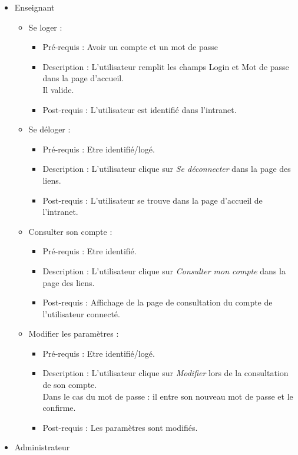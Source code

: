 	\begin{itemize}
	\item Enseignant
		\begin{itemize}
		\item Se loger :
			\begin{itemize}
			\item Pr{\'e}-requis : Avoir un compte et un mot de passe
			\item Description : L'utilisateur remplit les
			champs Login et Mot de passe dans la page d'accueil.\\
			Il valide.
			\item Post-requis : L'utilisateur est identifi{\'e} dans l'intranet.
			\end{itemize}
		\item Se d{\'e}loger :
			\begin{itemize}
			\item Pr{\'e}-requis : Etre identifi{\'e}/log{\'e}. 
			\item Description : L'utilisateur clique sur
			{\it Se d{\'e}connecter} dans la page des liens.
			\item Post-requis : L'utilisateur se trouve dans la page d'accueil de l'intranet.
			\end{itemize}
		\item Consulter son compte :
			\begin{itemize}
			\item  Pr{\'e}-requis : Etre identifi{\'e}.
			\item Description : L'utilisateur clique sur
			{\it Consulter mon compte} dans la page des liens. 
			\item Post-requis : Affichage de la page de
			consultation du compte de l'utilisateur connect{\'e}.
			\end{itemize}
		\item Modifier les param{\`e}tres :
			\begin{itemize}
			\item Pr{\'e}-requis : Etre identifi{\'e}/log{\'e}. 
			\item Description : L'utilisateur clique sur
			{\it Modifier} lors de la consultation de son compte.\\
			Dans le cas du mot de passe : il entre son
			nouveau mot de passe et le confirme.
			\item Post-requis : Les param{\`e}tres sont modifi{\'e}s.
			\end{itemize}
		\end{itemize}
	\item Administrateur

\end{itemize}
